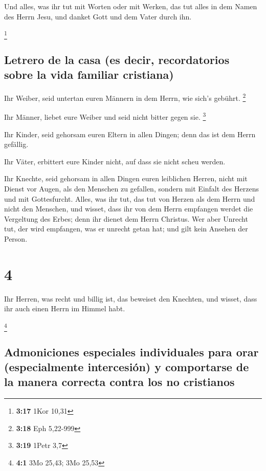  Und alles, was ihr tut mit Worten oder mit Werken, das
tut alles in dem Namen des Herrn Jesu, und danket Gott und dem Vater
durch ihn.

\footnote{\textbf{3:17} 1Kor 10,31}

\hypertarget{letrero-de-la-casa-es-decir-recordatorios-sobre-la-vida-familiar-cristiana}{%
\subsection{Letrero de la casa (es decir, recordatorios sobre la vida
familiar
cristiana)}\label{letrero-de-la-casa-es-decir-recordatorios-sobre-la-vida-familiar-cristiana}}

 Ihr Weiber, seid untertan euren Männern in dem Herrn,
wie sich's gebührt. \footnote{\textbf{3:18} Eph 5,22-999}

 Ihr Männer, liebet eure Weiber und seid nicht bitter
gegen sie. \footnote{\textbf{3:19} 1Petr 3,7}

 Ihr Kinder, seid gehorsam euren Eltern in allen Dingen;
denn das ist dem Herrn gefällig.

 Ihr Väter, erbittert eure Kinder nicht, auf dass sie
nicht scheu werden.

 Ihr Knechte, seid gehorsam in allen Dingen euren
leiblichen Herren, nicht mit Dienst vor Augen, als den Menschen zu
gefallen, sondern mit Einfalt des Herzens und mit Gottesfurcht.
 Alles, was ihr tut, das tut von Herzen als dem Herrn und
nicht den Menschen,  und wisset, dass ihr von dem Herrn
empfangen werdet die Vergeltung des Erbes; denn ihr dienet dem Herrn
Christus.  Wer aber Unrecht tut, der wird empfangen, was
er unrecht getan hat; und gilt kein Ansehen der Person.

\hypertarget{section-3}{%
\section{4}\label{section-3}}

 Ihr Herren, was recht und billig ist, das beweiset den
Knechten, und wisset, dass ihr auch einen Herrn im Himmel habt.

\footnote{\textbf{4:1} 3Mo 25,43; 3Mo 25,53}

\hypertarget{admoniciones-especiales-individuales-para-orar-especialmente-intercesiuxf3n-y-comportarse-de-la-manera-correcta-contra-los-no-cristianos}{%
\subsection{Admoniciones especiales individuales para orar
(especialmente intercesión) y comportarse de la manera correcta contra
los no
cristianos}\label{admoniciones-especiales-individuales-para-orar-especialmente-intercesiuxf3n-y-comportarse-de-la-manera-correcta-contra-los-no-cristianos}}

